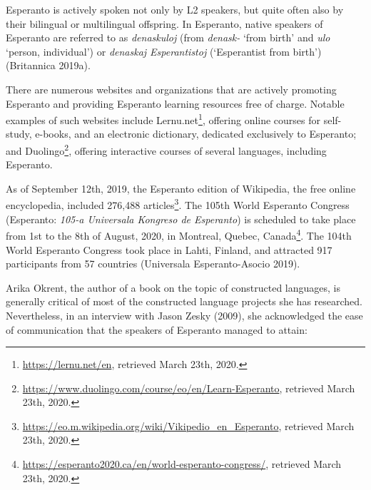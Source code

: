 Esperanto is actively spoken not only by L2 speakers, but quite often also by their bilingual or multilingual offspring.
In Esperanto, native speakers of Esperanto are referred to as \textit{denaskuloj} (from \textit{denask-} `from birth' and \textit{ulo} `person, individual') or \textit{denaskaj Esperantistoj} (`Esperantist from birth')
(Britannica 2019a).

There are numerous websites and organizations that are actively promoting Esperanto and providing Esperanto learning resources free of charge.
Notable examples of such websites include Lernu.net\footnote{\url{https://lernu.net/en}, retrieved March 23th, 2020.}, offering online courses for self-study, e-books, and an electronic dictionary, dedicated exclusively to Esperanto; and Duolingo\footnote{\url{https://www.duolingo.com/course/eo/en/Learn-Esperanto}, retrieved March 23th, 2020.}, offering interactive courses of several languages, including Esperanto.

As of September 12th, 2019, the Esperanto edition of Wikipedia, the free online encyclopedia, included 276,488 articles\footnote{\url{https://eo.m.wikipedia.org/wiki/Vikipedio_en_Esperanto}, retrieved March 23th, 2020.}.
The 105th World Esperanto Congress (Esperanto: \textit{105-a Universala Kongreso de Esperanto}) is scheduled to take place from 1st to the 8th of August, 2020, in Montreal, Quebec, Canada\footnote{\url{https://esperanto2020.ca/en/world-esperanto-congress/}, retrieved March 23th, 2020.}.
The 104th World Esperanto Congress took place in Lahti, Finland, and attracted 917 participants from 57 countries (Universala Esperanto-Asocio 2019).


Arika Okrent, the author of a book on the topic of constructed languages, is generally critical of most of the constructed language projects she has researched.
Nevertheless, in an interview with Jason Zesky (2009), she acknowledged the ease of communication that the speakers of Esperanto managed to attain:


